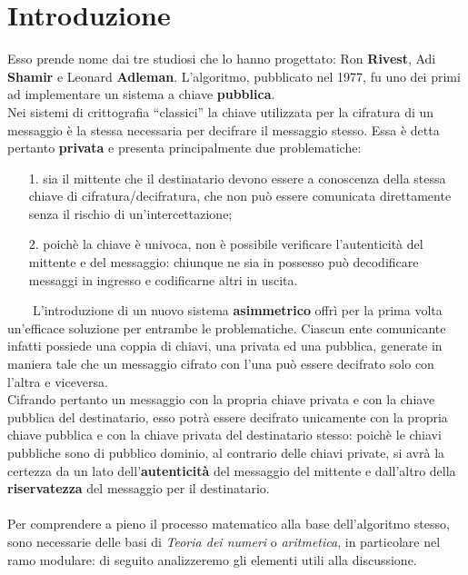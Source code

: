 \section*{Introduzione}
Esso prende nome dai tre studiosi che lo hanno progettato: Ron \textbf{Rivest}, Adi \textbf{Shamir} e Leonard \textbf{Adleman}. L'algoritmo, pubblicato nel 1977, fu uno dei primi ad implementare un sistema a chiave \textbf{pubblica}.\\
Nei sistemi di crittografia ``classici'' la chiave utilizzata per la cifratura di un messaggio è la stessa necessaria per decifrare il messaggio stesso. Essa è detta pertanto \textbf{privata} e presenta principalmente due problematiche:
\begin{enumerate}
    \item[1.] sia il mittente che il destinatario devono essere a conoscenza della stessa chiave di cifratura/decifratura, che non può essere comunicata direttamente senza il rischio di un'intercettazione;
    \item[2.] poichè la chiave è univoca, non è possibile verificare l'autenticità del mittente e del messaggio: chiunque ne sia in possesso può decodificare messaggi in ingresso e codificarne altri in uscita.
\end{enumerate}
\ \ \ \ L'introduzione di un nuovo sistema \textbf{asimmetrico} offrì per la prima volta un'efficace soluzione per entrambe le problematiche. Ciascun ente comunicante infatti possiede una coppia di chiavi, una privata ed una pubblica, generate in maniera tale che un messaggio cifrato con l'una può essere decifrato solo con l'altra e viceversa.\\
Cifrando pertanto un messaggio con la propria chiave privata e con la chiave pubblica del destinatario, esso potrà essere decifrato unicamente con la propria chiave pubblica e con la chiave privata del destinatario stesso: poichè le chiavi pubbliche sono di pubblico dominio, al contrario delle chiavi private, si avrà la certezza da un lato dell'\textbf{autenticità} del messaggio del mittente e dall'altro della \textbf{riservatezza} del messaggio per il destinatario.\\\\
Per comprendere a pieno il processo matematico alla base dell'algoritmo stesso, sono necessarie delle basi di \emph{Teoria dei numeri} o \emph{aritmetica}, in particolare nel ramo modulare: di seguito analizzeremo gli elementi utili alla discussione.